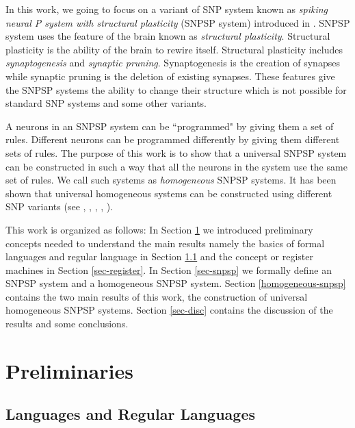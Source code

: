 \documentclass[smallextended]{svjour3}
\begin{document}
In this work, we going to focus on a variant of SNP system known as \textit{spiking neural P system with structural plasticity} (SNPSP system) 
introduced in \cite{cabarle-2015-structural-plasticity}. SNPSP system uses the feature of the brain known as  \textit{structural plasticity}. Structural plasticity is the ability
of the brain to rewire itself. Structural plasticity includes \textit{synaptogenesis} and \textit{synaptic pruning}. Synaptogenesis is the creation of 
synapses while synaptic pruning is the deletion of existing synapses. These features give the SNPSP systems the ability to change their structure 
which is not possible for standard SNP systems and some other variants.

A neurons in an SNPSP system can be ``programmed" by giving them a set of rules. Different neurons can be programmed differently by giving them 
different sets of rules. The purpose of this work is to show that a universal SNPSP system can be constructed in such a way that all the neurons in
the system use the same set of rules. We call such systems as \textit{homogeneous} SNPSP systems. It has been shown that universal homogeneous systems
can be constructed using different SNP variants (see \cite{HSNP}, \cite{HISNP}, \cite{HSNP-R}, \cite{HSNP-S}, \cite{HSNP-A}).

This work is organized as follows: In Section \ref{sec-prelims} we introduced preliminary concepts needed to understand the main results namely the
basics of formal languages and regular language in Section \ref{sec-lang-reg} and the concept or register machines in Section \ref{sec-register}. In
Section \ref{sec-snpsp} we formally define an SNPSP system and a homogeneous SNPSP system. Section \ref{homogeneous-snpsp} contains the two main results of this work, 
the  construction of universal homogeneous SNPSP systems. Section \ref{sec-disc} contains the discussion of the results and some conclusions.


\section{Preliminaries} \label{sec-prelims}

\subsection{Languages and Regular Languages} \label{sec-lang-reg}
\end{document}
